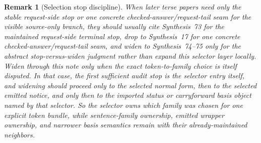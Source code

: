 \documentclass[11pt]{article}
\newtheorem{remark}{Remark}
\begin{document}
\begin{remark}[Selection stop discipline]
When later terse papers need only the stable request-side stop or one concrete checked-answer/request-tail seam for the visible source-only branch, they should usually cite Synthesis~73 for the maintained request-side terminal stop, drop to Synthesis~17 for one concrete checked-answer/request-tail seam, and widen to Synthesis~74--75 only for the abstract stop-versus-widen judgment rather than expand this selector layer locally.
Widen through this note only when the exact token-to-family choice is itself disputed. In that case, the first sufficient audit stop is the selector entry itself, and widening should proceed only to the selected normal form, then to the selected emitted notice, and only then to the imported status or carryforward basis object named by that selector.
So the selector owns which family was chosen for one explicit token bundle, while sentence-family ownership, emitted wrapper ownership, and narrower basis semantics remain with their already-maintained neighbors.
\end{remark}
\end{document}
